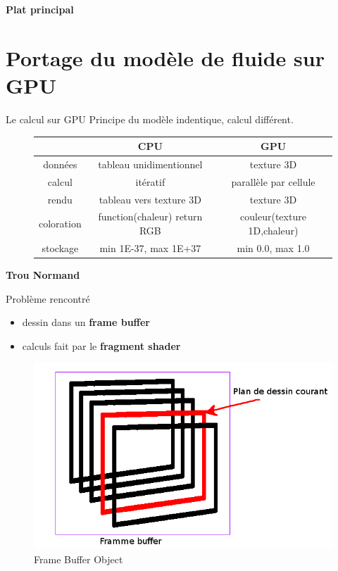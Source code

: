 \documentclass{beamer}
\begin{document}
\begin{frame}
  \begin{center}
    \textbf{Plat principal}
  \end{center}
\end{frame}


\section{Portage du modèle de fluide sur GPU}
\begin{frame}{Le calcul sur GPU}
  Principe du modèle indentique, calcul différent.\\
  \begin{figure}[!h]
    \begin{tabular}{c|c|c}
       & CPU & GPU \\
      \hline
      données & tableau unidimentionnel  & texture 3D \\
      calcul  & itératif                 & parallèle par cellule \\
      rendu   & tableau vers texture 3D    & texture 3D \\
      coloration & function(chaleur) return RGB & couleur(texture 1D,chaleur) \\
      stockage & min 1E-37, max 1E+37 & min 0.0, max 1.0 \\
    \end{tabular}
  \end{figure}
\end{frame}

\begin{frame}
  \begin{center}
    \textbf{Trou Normand}
  \end{center}
\end{frame}

\begin{frame}{Problème rencontré}
  \begin{itemize}
  \item dessin dans un \textbf{frame buffer}
  \item calculs fait par le \textbf{fragment shader}
  \end{itemize}
  \begin{figure}[!h]
    \centering\includegraphics[scale=0.3]{FBO.png}
    \caption{Frame Buffer Object}
    \label{AvecPerlin}
  \end{figure}
\end{frame}
\end{document}

